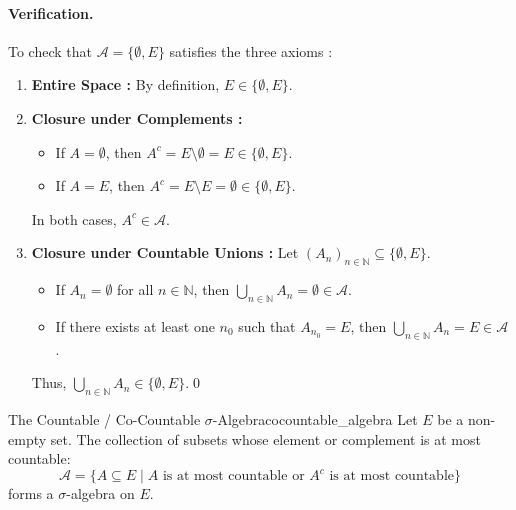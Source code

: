 \paragraph{Verification.}
To check that $\mathcal{A} = \{\emptyset, E\}$ satisfies the three axioms :
\begin{enumerate}[label=(\roman*)]
    \item \textbf{Entire Space :} By definition, $E \in \{\emptyset, E\}$.
    \item \textbf{Closure under Complements :} 
    \begin{itemize}
        \item If $A = \emptyset$, then $A^c = E \setminus \emptyset = E \in \{\emptyset, E\}$.
        \item If $A = E$, then $A^c = E \setminus E = \emptyset \in \{\emptyset, E\}$.
    \end{itemize}
    In both cases, $A^c \in \mathcal{A}$.
    \item \textbf{Closure under Countable Unions :} Let $(A_n)_{n \in \mathbb{N}} \subseteq \{\emptyset, E\}$.
    \begin{itemize}
        \item If $A_n = \emptyset$ for all $n \in \mathbb{N}$, then $\bigcup_{n \in \mathbb{N}} A_n = \emptyset \in \mathcal{A}$.
        \item If there exists at least one $n_0$ such that $A_{n_0} = E$, then $\bigcup_{n \in \mathbb{N}} A_n = E \in \mathcal{A}$.
    \end{itemize}
    Thus, $\bigcup_{n \in \mathbb{N}} A_n \in \{\emptyset, E\}$.\qed
\end{enumerate}

\vspace{1em}


\begin{example}{The Countable / Co-Countable $\sigma$-Algebra}{cocountable_algebra}
Let $E$ be a non-empty set. The collection of subsets whose element or complement is at most countable:
\[
    \mathcal{A} = \{ A \subseteq E \mid A \text{ is at most countable or } A^c \text{ is at most countable} \}
\]
forms a $\sigma$-algebra on $E$.
\end{example}

